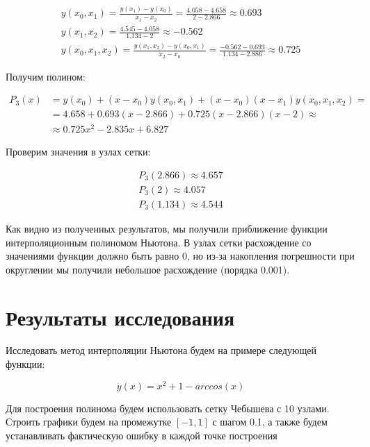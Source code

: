 \documentclass{article}
\begin{document}
\begin{gather}
y(x_0, x_1) = \frac{y(x_1) - y(x_0)}{x_1 - x_2} = \frac{4.058 - 4.658}{2 - 2.866} \approx 0.693 \nonumber \\
y(x_1, x_2) = \frac{4.545 - 4.058}{1.134 - 2} \approx -0.562 \nonumber \\
y(x_0, x_1, x_2) = \frac{y(x_1, x_2) - y(x_0, x_1)}{x_2 - x_0} = \frac{-0.562 - 0.693}{1.134 - 2.886} \approx 0.725
\end{gather}

Получим полином:

\begin{align}
P_3(x) &= y(x_0) + (x - x_0)y(x_0, x_1) + (x - x_0)(x - x_1)y(x_0, x_1, x_2) = \nonumber \\
        &= 4.658 + 0.693(x - 2.866) + 0.725(x - 2.866)(x - 2) \approx \nonumber \\
        &\approx 0.725x^2 - 2.835x + 6.827
\end{align}

Проверим значения в узлах сетки:

\begin{gather}
P_3(2.866) \approx 4.657 \nonumber \\
P_3(2) \approx 4.057 \nonumber \\
P_3(1.134) \approx 4.544
\end{gather}

Как видно из полученных результатов, мы получили приближение функции интерполяционным полиномом Ньютона. В узлах сетки расхождение со значениями функции должно быть равно 0, но из-за накопления погрешности при округлении мы получили небольшое расхождение (порядка 0.001).

\section{Результаты исследования}

Исследовать метод интерполяции Ньютона будем на примере следующей функции:

\begin{equation}
y(x) = x^2 + 1 - arccos(x)
\end{equation}

Для построения полинома будем использовать сетку Чебышева с 10 узлами. Строить графики будем на промежутке $[-1, 1]$ с шагом 0.1, а также будем устанавливать фактическую ошибку в каждой точке построения
\end{document}
